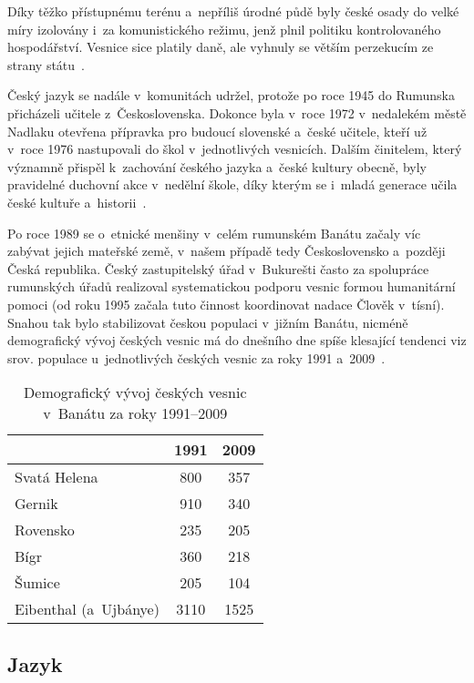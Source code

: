 Díky těžko přístupnému terénu a~nepříliš úrodné půdě byly české osady do velké míry izolovány i~za komunistického režimu, jenž plnil politiku kontrolovaného hospodářství. Vesnice sice platily daně, ale vyhnuly se větším perzekucím ze strany státu~\parencite{Frnochova2012}.

Český jazyk se nadále v~komunitách udržel, protože po roce 1945 do Rumunska přicházeli učitele z~Československa. Dokonce byla v~roce 1972 v~nedalekém městě Nadlaku otevřena přípravka pro budoucí slovenské a~české učitele, kteří už v~roce 1976 nastupovali do škol v~jednotlivých vesnicích. Dalším činitelem, který významně přispěl k~zachování českého jazyka a~české kultury obecně, byly pravidelné duchovní akce v~nedělní škole, díky kterým se i~mladá generace učila české kultuře a~historii~\parencite{Vaculik2009b}.

Po roce 1989 se o~etnické menšiny v~celém rumunském Banátu začaly víc zabývat jejich mateřské země, v~našem případě tedy Československo a~později Česká republika. Český zastupitelský úřad v~Bukurešti často za spolupráce rumunských úřadů realizoval systematickou podporu vesnic formou humanitární pomoci (od roku 1995 začala tuto činnost koordinovat nadace Člověk v~tísní). Snahou tak bylo stabilizovat českou populaci v~jižním Banátu, nicméně demografický vývoj českých vesnic má do dnešního dne spíše klesající tendenci viz srov. populace u~jednotlivých českých vesnic za roky 1991 a~2009~\parencite{Gecse2013}.

\begin{table}[h!]
\centering
\begin{tabular}{||l c c||} 
 \hline
   & 1991 & 2009 \\ [0.5ex] 
 \hline\hline
 Svatá Helena & 800 & 357 \\ 
 \hline
 Gernik & 910 & 340 \\
 \hline
 Rovensko & 235 & 205 \\
 \hline
 Bígr & 360 & 218 \\
 \hline
 Šumice & 205 & 104  \\ [1ex] 
 \hline
  Eibenthal (a~Ujbánye) & 3110 & 1525 \\ [1ex] 
 \hline
\end{tabular}
\caption*{Demografický vývoj českých vesnic v~Banátu za roky 1991–2009}
\label{table:1}
\end{table}

\hypertarget{jazyk}{%
\subsection*{Jazyk}\label{jazyk}}

